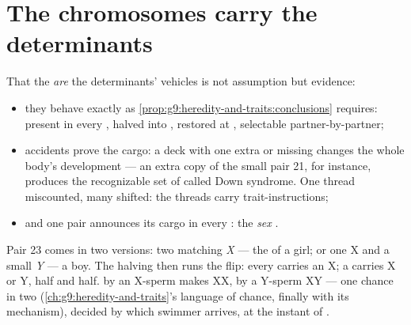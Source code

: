 \section{The chromosomes carry the determinants}

\begin{proposition}\label{prop:g9:chromosomes:evidence}
That the  \emph{are} the determinants' vehicles
is not assumption but evidence:
\begin{itemize}
  \item they behave exactly as
        \cref{prop:g9:heredity-and-traits:conclusions}
        requires: present in every , halved into
        , restored at , selectable
        partner-by-partner;
  \item {} accidents prove the cargo: a deck with
        one  extra or missing changes the whole
        body's development --- an extra copy of the small
        pair 21, for instance, produces the recognizable
        set of  called Down syndrome. One thread
        miscounted, many  shifted: the threads
        carry trait-instructions;
  \item and one pair announces its cargo in every
        : the \emph{sex }.
\end{itemize}
\end{proposition}
\admitted

\begin{definition}\label{def:g9:chromosomes:xy}
Pair 23 comes in two versions: two matching \emph{X}
 --- the  of a girl; or one X and a
small \emph{Y} --- a boy. The halving then runs the flip:
every  carries an X; a  carries X or Y,
half and half.  by an X-sperm makes XX, by a
Y-sperm XY --- one chance in two
(\cref{ch:g9:heredity-and-traits}'s language of chance,
finally with its mechanism), decided by which swimmer
arrives, at the instant of .
\end{definition}

